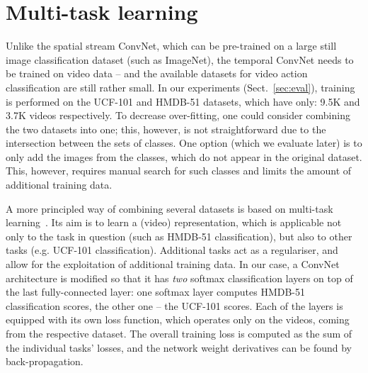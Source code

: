 \documentclass{article} %
\makeatletter
\newcommand{\sref}[1]{Sect.~\ref{#1}}
\newcommand{\note}[1]{\textbf{NOTE: #1}}
\newcommand*{\eg}{e.g.\@\xspace}
\DeclareMathOperator{\Lcal}{\mathcal{L}}
\makeatother
\begin{document}
\section{Multi-task learning}
\label{sec:multi}

Unlike the spatial stream ConvNet, which can be pre-trained on a large
still image classification dataset (such as ImageNet), the temporal
ConvNet needs to be trained on video data -- and the available datasets
for video action classification are still rather small.  In our experiments
(\sref{sec:eval}), training is performed on the UCF-101 and HMDB-51
datasets, which have only: 9.5K and 3.7K videos
respectively.  To decrease over-fitting, one could consider combining
the two datasets into one; this, however, is not straightforward due
to the intersection between the sets of classes. 
One option (which we evaluate later) is to only add the images from the classes, which do not appear in the original dataset.
This, however, requires manual search for such classes and limits the amount of additional training data.

A more principled way of combining several datasets is based on multi-task learning~\cite{Collobert08}.
Its aim is to learn a (video) representation, which is applicable not only to the task in question (such as HMDB-51 classification), but also
to other tasks (\eg UCF-101 classification). Additional tasks act as a regulariser, and allow for the exploitation of additional training data.
In our case, a ConvNet architecture is modified so that it has \emph{two} softmax classification layers on
top of the last fully-connected layer: one softmax layer computes HMDB-51 classification scores, the other one -- the UCF-101 scores. Each of the layers is equipped with
its own loss function, which operates only on the videos, coming from the respective dataset. The overall training loss is computed as the sum of the individual
tasks' losses, and the network weight derivatives can be found by back-propagation.


\end{document}
